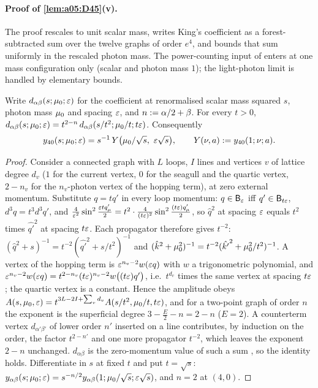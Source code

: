 \paragraph{Proof of \cref{lem:a05:D45}(v).} The proof rescales to unit scalar mass, writes King's coefficient as a forest-subtracted sum over the twelve graphs of order $e^4$, and bounds that sum uniformly in the rescaled photon mass. The power-counting input of \cite{Rei88,Rei88b} enters at one mass configuration only (scalar and photon mass $1$); the light-photon limit is handled by elementary bounds.

\begin{lemma}\label{lem:a05:SC}
Write $d_{\alpha\beta}(s;\mu_0;\varepsilon)$ for the coefficient at renormalised scalar mass squared $s$, photon mass $\mu_0$ and spacing $\varepsilon$, and $n:=\alpha/2+\beta$. For every $t>0$, $d_{\alpha\beta}(s;\mu_0;\varepsilon)=t^{2-n}\,d_{\alpha\beta}(s/t^2;\mu_0/t;t\varepsilon)$. Consequently
\[
y_{40}(s;\lmu;\eps)=s^{-1}\,Y\big(\lmu/\sqrt s,\ \eps\sqrt s\big),\qquad Y(\nu,a)\defeq y_{40}(1;\nu;a).
\]
\end{lemma}
\begin{proof}
Consider a connected graph with $L$ loops, $I$ lines and vertices $v$ of lattice degree $d_v$ ($1$ for the current vertex, $0$ for the seagull and the quartic vertex, $2-n_v$ for the $n_v$-photon vertex of the hopping term), at zero external momentum. Substitute $q=tq'$ in every loop momentum: $q\in\mathsf B_{\varepsilon}$ iff $q'\in\mathsf B_{t\varepsilon}$, $d^3q=t^3d^3q'$, and $\frac4{\varepsilon^2}\sin^2\frac{\varepsilon tq'_\mu}2=t^2\cdot\frac4{(t\varepsilon)^2}\sin^2\frac{(t\varepsilon)q'_\mu}2$, so $\hat q^2$ at spacing $\varepsilon$ equals $t^2$ times $\hat{q'}^2$ at spacing $t\varepsilon$. Each propagator therefore gives $t^{-2}$: $(\hat q^2+s)^{-1}=t^{-2}(\hat{q'}^2+s/t^2)^{-1}$ and $(\hat k^2+\mu_0^2)^{-1}=t^{-2}(\hat{k'}^2+\mu_0^2/t^2)^{-1}$. A vertex of the hopping term is $\varepsilon^{n_v-2}w(\varepsilon q)$ with $w$ a trigonometric polynomial, and $\varepsilon^{n_v-2}w(\varepsilon q)=t^{2-n_v}(t\varepsilon)^{n_v-2}w\big((t\varepsilon)q'\big)$, i.e.\ $t^{d_v}$ times the same vertex at spacing $t\varepsilon$; the quartic vertex is a constant. Hence the amplitude obeys $A(s,\mu_0,\varepsilon)=t^{3L-2I+\sum_vd_v}A(s/t^2,\mu_0/t,t\varepsilon)$, and for a two-point graph of order $n$ the exponent is the superficial degree $3-\frac E2-n=2-n$ ($E=2$). A counterterm vertex $d_{\alpha'\beta'}$ of lower order $n'$ inserted on a line contributes, by induction on the order, the factor $t^{2-n'}$ and one more propagator $t^{-2}$, which leaves the exponent $2-n$ unchanged. $d_{\alpha\beta}$ is the zero-momentum value of such a sum \cite[(3.32)--(3.33)]{K1}, so the identity holds. Differentiate in $s$ at fixed $t$ and put $t=\sqrt s$: $y_{\alpha\beta}(s;\mu_0;\varepsilon)=s^{-n/2}y_{\alpha\beta}(1;\mu_0/\sqrt s;\varepsilon\sqrt s)$, and $n=2$ at $(4,0)$.
\end{proof}


